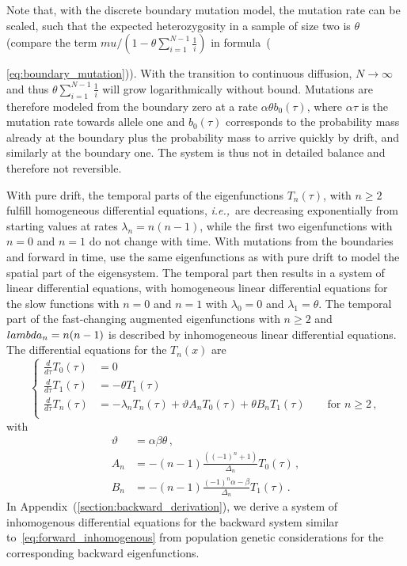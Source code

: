 \documentclass[preprint]{elsarticle}
\newcommand\ie{{\it i.e.,}}
\begin{document}
Note that, with the discrete boundary mutation model, the mutation rate can be scaled, such that the expected heterozygosity in a sample of size two is $\theta$ (compare the term $mu/(1-\theta\sum_{i=1}^{N-1}\frac{1}{i})$ in formula~({\ref{eq:boundary_mutation})). With the transition to continuous diffusion, $N\to\infty$ and thus $\theta\sum_{i=1}^{N-1}\frac{1}{i}$ will grow logarithmically without bound. Mutations are therefore modeled from the boundary zero at a rate $\alpha\theta b_0(\tau)$, where $\alpha\tau$ is the mutation rate towards allele one and $b_0(\tau)$ corresponds to the probability mass already at the boundary plus the probability mass to arrive quickly by drift, and similarly at the boundary one. The system is thus not in detailed balance and therefore not reversible.

With pure drift, the temporal parts of the eigenfunctions $T_n(\tau)$, with $n\geq 2$ fulfill homogeneous differential equations, \ie\ are decreasing exponentially from starting values at rates $\lambda_n=n(n-1)$, while the first two eigenfunctions with $n=0$ and $n=1$ do not change with time. With mutations from the boundaries and forward in time, \citet{Vogl16} use the same eigenfunctions as with pure drift to model the spatial part of the eigensystem. The temporal part then results in a system of linear differential equations, with homogeneous linear differential equations for the slow functions with $n=0$ and $n=1$ with $\lambda_0=0$ and $\lambda_1=\theta$. The temporal part of the fast-changing augmented eigenfunctions with $n\geq 2$ and $\\lambda_n=n(n-1)$ is described by inhomogeneous linear differential equations. The differential equations for the $T_n(x)$ are
\begin{equation}\label{eq:forward_inhomogenous}
\begin{cases}
  \frac{d}{d\tau} T_0(\tau)&= 0\\
  \frac{d}{d\tau} T_1(\tau)&= -\theta T_1(\tau)\\
  \frac{d}{d\tau} T_n(\tau)&= -\lambda_n T_n(\tau)+\vartheta A_n T_0(\tau)+\theta B_n T_1(\tau) \qquad\text{for $n\geq 2$}\,,\\
\end{cases}
\end{equation}
with
\begin{equation}
\begin{split}
    \vartheta&=\alpha\beta\theta\,,\\
    A_n&=-(n-1)\frac{((-1)^n+1)}{\Delta_n}T_0(\tau)\,,\\
    B_n&=-(n-1)\frac{(-1)^n\alpha-\beta}{\Delta_n}T_1(\tau)\,.
\end{split}
\end{equation}
In Appendix~(\ref{section:backward_derivation}), we derive a system of inhomogenous differential equations for the backward system similar to~\eqref{eq:forward_inhomogenous} from population genetic considerations for the corresponding backward eigenfunctions. 

}
\end{document}
